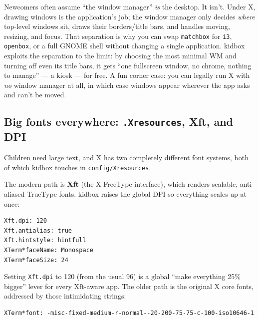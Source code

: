 \documentclass[11pt,oneside]{article}
\newcommand{\code}[1]{\texorpdfstring{\textcolor{kbblue}{\texttt{#1}}}{#1}}
\newcommand{\file}[1]{\textcolor{kbteal}{\texttt{#1}}}
\begin{document}
\begin{deeper}
Newcomers often assume ``the window manager'' \emph{is} the desktop. It isn't.
Under X, drawing windows is the application's job; the window manager only
decides \emph{where} top-level windows sit, draws their borders/title bars, and
handles moving, resizing, and focus. That separation is why you can swap
\texttt{matchbox} for \texttt{i3}, \texttt{openbox}, or a full GNOME shell
without changing a single application. kidbox exploits the separation to the
limit: by choosing the most minimal WM and turning off even its title bars, it
gets ``one fullscreen window, no chrome, nothing to manage'' --- a kiosk --- for
free. A fun corner case: you can legally run X with \emph{no} window manager at
all, in which case windows appear wherever the app asks and can't be moved.
\end{deeper}

\subsection{Big fonts everywhere: \texttt{.Xresources}, Xft, and DPI}

Children need large text, and X has two completely different font systems, both
of which kidbox touches in \file{config/Xresources}.

The modern path is \textbf{Xft} (the X FreeType interface), which renders
scalable, anti-aliased TrueType fonts. kidbox raises the global DPI so
everything scales up at once:

\begin{lstlisting}
Xft.dpi: 120
Xft.antialias: true
Xft.hintstyle: hintfull
XTerm*faceName: Monospace
XTerm*faceSize: 24
\end{lstlisting}

Setting \code{Xft.dpi} to 120 (from the usual 96) is a global ``make everything
\textsf{25\%} bigger'' lever for every Xft-aware app. The older path is the
original X core fonts, addressed by those intimidating strings:

\begin{lstlisting}
XTerm*font: -misc-fixed-medium-r-normal--20-200-75-75-c-100-iso10646-1
\end{lstlisting}
\end{document}
